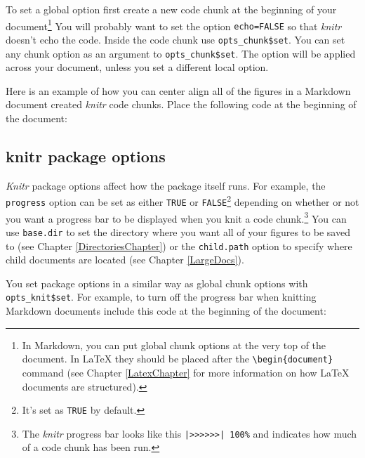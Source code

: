 {To set a global option first create a new code chunk at the beginning of your document\footnote{In Markdown, you can put global chunk options at the very top of the document. In LaTeX they should be placed after the \texttt{\textbackslash{}begin\{document\}} command (see Chapter \ref{LatexChapter} for more information on how LaTeX documents are structured).} You will probably want to set the option {\tt{echo=FALSE}} so that {\emph{knitr}} doesn't echo the code. Inside the code chunk use {\tt{opts\_chunk\$set}}. You can set any chunk option as an argument to {\tt{opts\_chunk\$set}}. The option will be applied across your document, unless you set a different local option. 

Here is an example of how you can center align all of the figures in a Markdown document created {\emph{knitr}} code chunks. Place the following code at the beginning of the document:

\begin{knitrout}
\color{fgcolor}
\end{knitrout}


\subsection{knitr package options}

{\emph{Knitr}} package options affect how the package itself runs. For example, the {\tt{progress}} option can be set as either {\tt{TRUE}} or {\tt{FALSE}}\footnote{It's set as {\tt{TRUE}} by default.} depending on whether or not you want a progress bar to be displayed when you knit a code chunk.\footnote{The {\emph{knitr}} progress bar looks like this {\tt{|>>>>>>| 100\%}} and indicates how much of a code chunk has been run.} You can use {\tt{base.dir}} to set the directory where you want all of your figures to be saved to (see Chapter \ref{DirectoriesChapter}) or the {\tt{child.path}} option to specify where child documents are located (see Chapter \ref{LargeDocs}).

You set package options in a similar way as global chunk options with {\tt{opts\_knit\$set}}. For example, to turn off the progress bar when knitting Markdown documents include this code at the beginning of the document:

}
